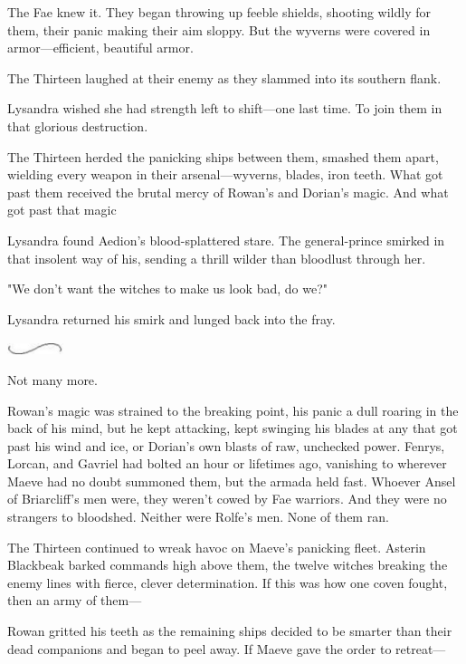 The Fae knew it.
They began throwing up feeble shields, shooting wildly for them, their panic making their aim sloppy.
But the wyverns were covered in armor---efficient, beautiful armor.

The Thirteen laughed at their enemy as they slammed into its southern flank.

Lysandra wished she had strength left to shift---one last time.
To join them in that glorious destruction.

The Thirteen herded the panicking ships between them, smashed them apart, wielding every weapon in their arsenal---wyverns, blades, iron teeth.
What got past them received the brutal mercy of Rowan's and Dorian's magic.
And what got past that magic 

Lysandra found Aedion's blood-splattered stare.
The general-prince smirked in that insolent way of his, sending a thrill wilder than bloodlust through her.

"We don't want the witches to make us look bad, do we?"

Lysandra returned his smirk and lunged back into the fray.

\begin{center}
	\includegraphics[width=0.65in,height=0.13in]{images/seperator}
\end{center}

Not many more.

Rowan's magic was strained to the breaking point, his panic a dull roaring in the back of his mind, but he kept attacking, kept swinging his blades at any that got past his wind and ice, or Dorian's own blasts of raw, unchecked power.
Fenrys, Lorcan, and Gavriel had bolted an hour or lifetimes ago, vanishing to wherever Maeve had no doubt summoned them, but the armada held fast.
Whoever Ansel of Briarcliff's men were, they weren't cowed by Fae warriors.
And they were no strangers to bloodshed.
Neither were Rolfe's men.
None of them ran.

The Thirteen continued to wreak havoc on Maeve's panicking fleet.
Asterin Blackbeak barked commands high above them, the twelve witches breaking the enemy lines with fierce, clever determination.
If this was how one coven fought, then an army of them---

Rowan gritted his teeth as the remaining ships decided to be smarter than their dead companions and began to peel away.
If Maeve gave the order to retreat---


